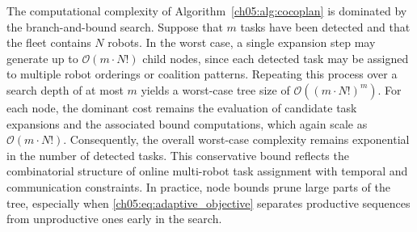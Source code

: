 The computational complexity of
Algorithm~\ref{ch05:alg:cocoplan} is dominated by the branch-and-bound search.
Suppose that $m$ tasks have been detected and that the fleet contains $N$
robots. In the worst case, a single expansion step may generate up to
$\mathcal{O}(m \cdot N!)$ child nodes, since each detected task may be assigned
to multiple robot orderings or coalition patterns. Repeating this process over
a search depth of at most $m$ yields a worst-case tree size of
$\mathcal{O}((m \cdot N!)^m)$. For each node, the dominant cost remains the
evaluation of candidate task expansions and the associated bound computations,
which again scale as $\mathcal{O}(m \cdot N!)$. Consequently, the overall
worst-case complexity remains exponential in the number of detected tasks.
This conservative bound reflects the combinatorial structure of online
multi-robot task assignment with temporal and communication constraints. In
practice, node bounds prune large parts of the tree, especially when
\eqref{ch05:eq:adaptive_objective} separates productive sequences from
unproductive ones early in the search.


